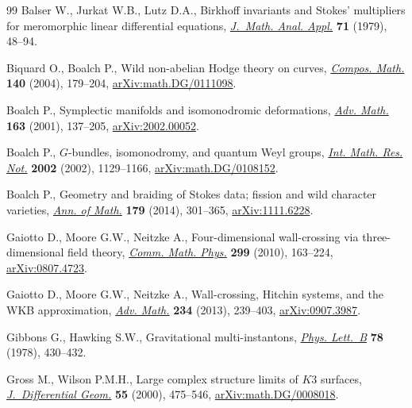 \documentclass[11pt]{article}
\numberwithin{equation}{section}
\numberwithin{equation}{section}
\begin{document}
\begin{thebibliography}{99}
Balser W., Jurkat W.B., Lutz D.A., Birkhoff invariants and {S}tokes'
 multipliers for meromorphic linear differential equations, \href{https://doi.org/10.1016/0022-247X(79)90217-8}{\textit{J.~Math.
 Anal. Appl.}} \textbf{71} (1979), 48--94.

Biquard O., Boalch P., Wild non-abelian {H}odge theory on curves,
 \href{https://doi.org/10.1112/S0010437X03000010}{\textit{Compos. Math.}} \textbf{140} (2004), 179--204,
 \href{https://arxiv.org/abs/math.DG/0111098}{arXiv:math.DG/0111098}.

Boalch P., Symplectic manifolds and isomonodromic deformations, \href{https://doi.org/10.1006/aima.2001.1998}{\textit{Adv.
 Math.}} \textbf{163} (2001), 137--205, \href{https://arxiv.org/abs/2002.00052}{arXiv:2002.00052}.

Boalch P., {$G$}-bundles, isomonodromy, and quantum {W}eyl groups, \href{https://doi.org/10.1155/S1073792802111081}{\textit{Int.
 Math. Res. Not.}} \textbf{2002} (2002), 1129--1166, \href{https://arxiv.org/abs/math.DG/0108152}{arXiv:math.DG/0108152}.

Boalch P., Geometry and braiding of {S}tokes data; fission and wild character
 varieties, \href{https://doi.org/10.4007/annals.2014.179.1.5}{\textit{Ann. of Math.}} \textbf{179} (2014), 301--365,
 \href{https://arxiv.org/abs/1111.6228}{arXiv:1111.6228}.

Gaiotto D., Moore G.W., Neitzke A., Four-dimensional wall-crossing via
 three-dimensional field theory, \href{https://doi.org/10.1007/s00220-010-1071-2}{\textit{Comm. Math. Phys.}} \textbf{299}
 (2010), 163--224, \href{https://arxiv.org/abs/0807.4723}{arXiv:0807.4723}.

Gaiotto D., Moore G.W., Neitzke A., Wall-crossing, {H}itchin systems, and the
 {WKB} approximation, \href{https://doi.org/10.1016/j.aim.2012.09.027}{\textit{Adv. Math.}} \textbf{234} (2013), 239--403,
 \href{https://arxiv.org/abs/0907.3987}{arXiv:0907.3987}.

Gibbons G., Hawking S.W., Gravitational multi-instantons, \href{https://doi.org/10.1016/0370-2693(78)90478-1}{\textit{Phys.
 Lett.~B}} \textbf{78} (1978), 430--432.

Gross M., Wilson P.M.H., Large complex structure limits of {$K3$} surfaces,
 \href{https://doi.org/10.4310/jdg/1090341262}{\textit{J.~Differential Geom.}} \textbf{55} (2000), 475--546,
 \href{https://arxiv.org/abs/math.DG/0008018}{arXiv:math.DG/0008018}.


\end{thebibliography}
\end{document}
